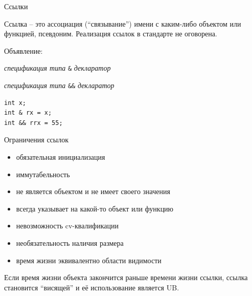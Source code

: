 \documentclass[unknownkeysallowed,xcolor=table]{beamer}
\begin{document}
\begin{frame}[fragile]{Ссылки}

Ссылка -- это ассоциация (``связывание'') имени с каким-либо объектом или функцией, псевдоним.
Реализация ссылок в стандарте не оговорена.

\vspace{2em}

Объявление:

\vspace{0.7em}

\emph{спецификация типа} \lstinline{&} \emph{декларатор}

\vspace{0.5em}

\emph{спецификация типа} \lstinline{&&} \emph{декларатор}

\vspace{1em}

\begin{lstlisting}
int x;
int & rx = x;
int && rrx = 55;
\end{lstlisting}

\end{frame}

\begin{frame}[fragile]{Ограничения ссылок}

\begin{itemize}
  \item обязательная инициализация \vspace{0.5em}
  \item иммутабельность \vspace{0.5em}
  \item не является объектом и не имеет своего значения \vspace{0.5em}
  \item всегда указывает на какой-то объект или функцию \vspace{0.5em}
  \item невозможность cv-квалификации \vspace{0.5em}
  \item необязательность наличия размера \vspace{0.5em}
  \item время жизни эквивалентно области видимости
\end{itemize}

\vspace{0.5em}

Если время жизни объекта закончится раньше времени жизни ссылки, ссылка становится ``висящей'' и её использование является UB.

\end{frame}
\end{document}
